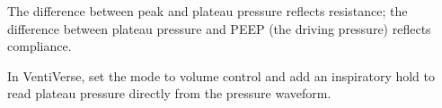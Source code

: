 \begin{clinicalpearl}
The difference between peak and plateau pressure reflects resistance; the difference between plateau pressure and PEEP (the driving pressure) reflects compliance.
\end{clinicalpearl}

\begin{simnote}
In VentiVerse, set the mode to volume control and add an inspiratory hold to read plateau pressure directly from the pressure waveform.
\end{simnote}
